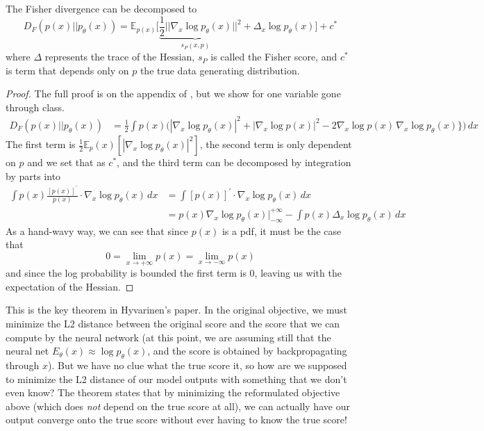     \begin{theorem}
      The Fisher divergence can be decomposed to 
      \begin{equation}
        D_F (p(x) || p_\theta (x)) = \mathbb{E}_{p(x)} \bigg[ \underbrace{\frac{1}{2} || \nabla_x \log p_\theta (x)}_{s_P (x, p)} ||^2 + \Delta_x \log p_\theta (x) \bigg] + c^\ast
      \end{equation}
      where $\Delta$ represents the trace of the Hessian, $s_P$ is called the Fisher score, and $c^\ast$ is  term that depends only on $p$ the true data generating distribution. 
    \end{theorem}
    \begin{proof}
      The full proof is on the appendix of \cite{orig_score}, but we show for one variable gone through class. 
      \begin{align}
        D_F (p(x) || p_\theta (x)) & = \frac{1}{2} \int p(x) \big( |\nabla_x \log p_\theta (x)|^2 + | \nabla_x \log p(x) |^2 - 2 \nabla_x \log p(x) \, \nabla_x \log p_\theta (x)\} \big) \,dx
      \end{align}
      The first term is $\frac{1}{2} \mathbb{E}_p(x) [|\nabla_x \log p_\theta (x)|^2]$, the second term is only dependent on $p$ and we set that as $c^\ast$, and the third term can be decomposed by integration by parts into  
      \begin{align}
        \int p(x) \frac{[p(x)]^\prime}{p(x)} \cdot \nabla_x \log p_\theta (x) \,dx & = \int [p(x)]^\prime \cdot \nabla_x \log p_\theta (x) \,dx \\ 
                                           & = p(x) \nabla_x \log p_\theta (x) \Big|_{-\infty}^{+\infty} - \int p(x) \Delta_x \log p_\theta (x) \,dx 
      \end{align}
      As a hand-wavy way, we can see that since $p(x)$ is a pdf, it must be the case that 
      \begin{equation}
        0 = \lim_{x \rightarrow +\infty} p(x) = \lim_{x \rightarrow -\infty} p(x) 
      \end{equation}
      and since the log probability is bounded the first term is $0$, leaving us with the expectation of the Hessian. 
    \end{proof} 

    This is the key theorem in Hyvarinen's paper. In the original objective, we must minimize the L2 distance between the original score and the score that we can compute by the neural network (at this point, we are assuming still that the neural net $E_\theta (x) \approx \log p_\theta (x)$, and the score is obtained by backpropagating through $x$). But we have no clue what the true score it, so how are we supposed to minimize the L2 distance of our model outputs with something that we don't even know? The theorem states that by minimizing the reformulated objective above (which does \textit{not} depend on the true score at all), we can actually have our output converge onto the true score without ever having to know the true score! 


